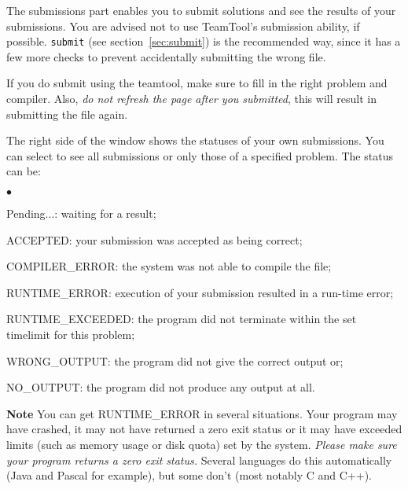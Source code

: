 \documentclass[a4paper]{artikel3}
\newcommand{\cmd}[1]{\texttt{#1}}
\newcommand{\strong}[1]{\textbf{#1}}
\newenvironment{citemize}
  {\begin{list}{$\bullet$}{\topsep 0cm \itemsep 0cm}}
  {\end{list}}
\begin{document}
The submissions part enables you to submit solutions and see the results of
your submissions. You are advised not to use TeamTool's submission ability,
if possible. \cmd{submit} (see section~\ref{sec:submit}) is the recommended
way, since it has a few more checks to prevent accidentally submitting the
wrong file.

If you do submit using the teamtool, make sure to fill in the right problem
and compiler. Also, \emph{do not refresh the page after you submitted}, this
will result in submitting the file again.

The right side of the window shows the statuses of your own submissions. You
can select to see all submissions or only those of a specified problem. The
status can be:

\begin{citemize}
\item[Pending...:] waiting for a result;
\item[ACCEPTED:] your submission was accepted as being correct;
\item[COMPILER\_ERROR:] the system was not able to compile the file;
\item[RUNTIME\_ERROR:] execution of your submission resulted in a run-time
error;
\item[RUNTIME\_EXCEEDED:] the program did not terminate within the set
timelimit for this problem;
\item[WRONG\_OUTPUT:] the program did not give the correct output or;
\item[NO\_OUTPUT:] the program did not produce any output at all.
\end{citemize}

\strong{Note} You can get RUNTIME\_ERROR in several situations. Your program
may have crashed, it may not have returned a zero exit status or it may have
exceeded limits (such as memory usage or disk quota) set by the system.
\emph{Please make sure your program returns a zero exit status.} Several
languages do this automatically (Java and Pascal for example), but some
don't (most notably C and C++).
\end{document}
